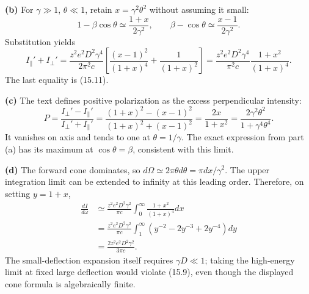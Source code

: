 \medskip\noindent\textbf{(b)} For $\gamma\gg1$, $\theta\ll1$,
retain $x=\gamma^2\theta^2$ without assuming it small:
\[
1-\beta\cos\theta\simeq\frac{1+x}{2\gamma^2},\qquad
\beta-\cos\theta\simeq\frac{x-1}{2\gamma^2}.
\]
Substitution yields
\[
\boxed{I_\parallel'+I_\perp'
=\frac{z^2e^2D^2\gamma^4}{2\pi^2c}
\left[\frac{(x-1)^2}{(1+x)^4}+\frac1{(1+x)^2}\right]
=\frac{z^2e^2D^2\gamma^4}{\pi^2c}
 \frac{1+x^2}{(1+x)^4}.}
\]
The last equality is (15.11).

\medskip\noindent\textbf{(c)} The text defines positive polarization
as the excess perpendicular intensity:
\[
P=\frac{I_\perp'-I_\parallel'}{I_\perp'+I_\parallel'}
=\frac{(1+x)^2-(x-1)^2}{(1+x)^2+(x-1)^2}
=\boxed{\frac{2x}{1+x^2}
=\frac{2\gamma^2\theta^2}{1+\gamma^4\theta^4}.}
\]
It vanishes on axis and tends to one at $\theta=1/\gamma$.
The exact expression from part (a) has its maximum at
$\cos\theta=\beta$, consistent with this limit.

\medskip\noindent\textbf{(d)} The forward cone dominates, so
$d\Omega\simeq2\pi\theta d\theta=\pi dx/\gamma^2$.
The upper integration limit can be extended to infinity at this
leading order.  Therefore, on setting $y=1+x$,
\begin{align*}
\frac{dI}{d\omega}
&\simeq\frac{z^2e^2D^2\gamma^2}{\pi c}
 \int_0^\infty\frac{1+x^2}{(1+x)^4}dx\\
&=\frac{z^2e^2D^2\gamma^2}{\pi c}
 \int_1^\infty(y^{-2}-2y^{-3}+2y^{-4})dy\\
&=\boxed{\frac{2z^2e^2D^2\gamma^2}{3\pi c}.}
\end{align*}
The small-deflection expansion itself requires $\gamma D\ll1$;
taking the high-energy limit at fixed large deflection would violate
(15.9), even though the displayed cone formula is algebraically finite.

